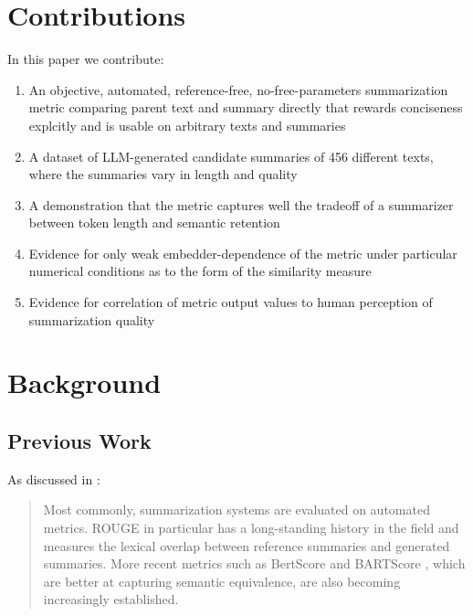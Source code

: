 \documentclass{article}
\begin{document}
\section{Contributions}

In this paper we contribute:

\begin{enumerate}
	\item An objective, automated, reference-free, no-free-parameters summarization metric comparing parent text and summary directly that rewards conciseness explcitly and is usable on arbitrary texts and summaries
	\item A dataset of LLM-generated candidate summaries of 456 different texts, where the summaries vary in length and quality
	\item A demonstration that the metric captures well the tradeoff of a summarizer between token length and semantic retention
	\item Evidence for only weak embedder-dependence of the metric under particular numerical conditions as to the form of the similarity measure
	\item Evidence for correlation of metric output values to human perception of summarization quality	
\end{enumerate}

\section{Background}

\subsection{Previous Work}
As discussed in \citep{retkowski2023current}:

\begin{quote}
Most commonly, summarization systems are evaluated on automated metrics. ROUGE \citep{lin_rouge_2004} in particular has a long-standing history in the field and measures the lexical overlap between reference summaries and generated summaries. More recent metrics such as BertScore \citep{zhang_bertscore_2019} and BARTScore \citep{yuan_bartscore_2021}, which are better at capturing semantic equivalence, are also becoming increasingly established. 
\end{quote}
\end{document}
